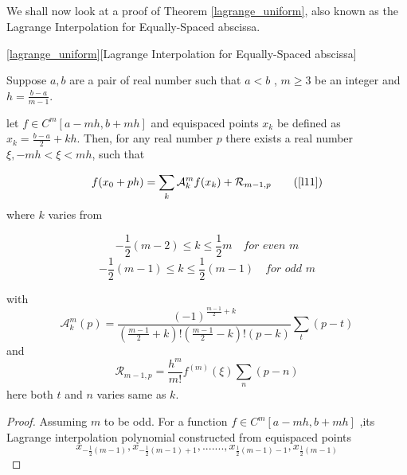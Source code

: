 \documentclass[../document.tex]{subfiles}
\begin{document}
	
	\begin{appendices}
		
		\chapter{}
		
		We shall now look at a proof of Theorem \ref{lagrange_uniform}, also known as the Lagrange Interpolation for Equally-Spaced abscissa.
		
		
		\begin{customthm}{\ref{lagrange_uniform}}[Lagrange Interpolation for Equally-Spaced abscissa] 
			
			Suppose $a,b$ are a pair of real number such that $a<b$ , $m \ge 3$ be an integer and $h = \frac{b-a}{m-1}$. 
			
			let $f \in C^{m}[a-mh,b+mh]$ and equispaced points $x_k$ be defined as  $x_k  = \frac{b-a}{2} +kh$.
			Then, for any real number $p$ there exists a real number 
			$\xi , -mh <\xi<mh $, such that
			
			\begin{equation}
				f(x_0 + ph) = \sum_{k} \mathcal{A}_{k}^{m} f(x_k) + \mathcal{R}_{m-1,p}
				\tag{\ref{l11}}
			\end{equation}
			where $k$ varies from
			
			
			
			$$
			-\frac{1}{2}(m-2) \leq k \leq \frac{1}{2}m  \quad 
			\textit{for even m}
			$$
			$$
			-\frac{1}{2}(m-1) \leq k \leq \frac{1}{2}(m-1)  \quad 
			\textit{for odd m}
			$$
			
			with
			$$
			\mathcal{A}_{k}^{m}(p) = 
			\frac{ (-1)^{\frac{m-1}{2}+k} }{
				(\frac{m-1}{2} + k)!
				(\frac{m-1}{2} - k)!
				(p-k)}
			\sum_{t}(p-t)
			$$
			and
			$$
			\mathcal{R}_{m-1,p} = \frac{ h^{m} }{m!} f^{(m)}(\xi)
			\sum_{n} (p-n)
			$$
			here both $t$ and $n$ varies same as $k$. 
		\end{customthm}
		\begin{proof}
			Assuming $m$ to be odd.
			For a function $f \in C^{m}[a-mh,b+mh]$ ,its Lagrange interpolation polynomial constructed from  equispaced points 
			$$
			x_{-\frac{1}{2}(m-1)} , x_{-\frac{1}{2}(m-1)+1} , .......
			, x_{\frac{1}{2}(m-1)-1} , x_{\frac{1}{2}(m-1)}
			$$
			

\end{proof}
\end{appendices}
\end{document}
